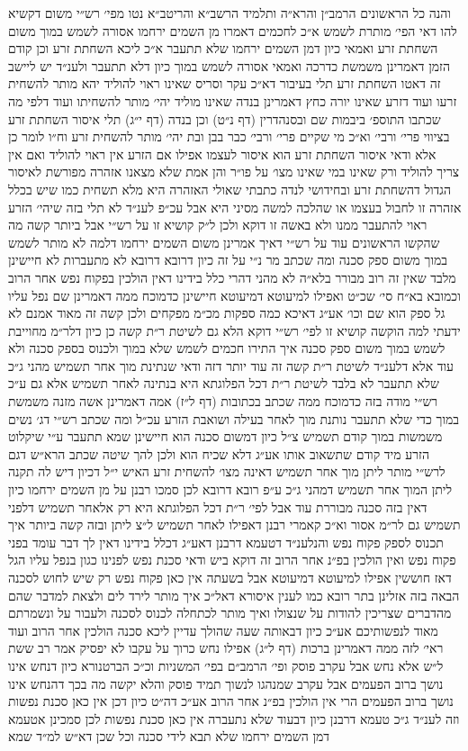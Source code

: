 \documentclass[12pt, openany]{book}
\begin{document}
\begin{multicols}{2}
והנה כל הראשונים הרמב״ן והרא״ה ותלמיד הרשב״א והריטב״א נטו מפי׳ רש״י משום דקשיא להו דאי הפי׳ מותרת לשמש א״כ לחכמים דאמרו מן השמים ירחמו אסורה לשמש במוך משום השחתת זרע ואמאי כיון דמן השמים ירחמו שלא תתעבר א״כ ליכא השחתת זרע וכן קודם הזמן דאמרינן משמשת כדרכה ואמאי אסורה לשמש במוך כיון דלא תתעבר ולענ״ד יש ליישב זה דאטו השחתת זרע תלי בעיבור דא״כ עקר וסריס שאינו ראוי להוליד יהא מותר להשחית זרעו ועוד דזרע שאינו יורה כחץ דאמרינן בנדה שאינו מוליד יהי׳ מותר להשחיתו ועוד דלפי מה שכתבו התוספ׳ ביבמות שם ובסנהדרין (דף נ״ט) וכן בנדה (דף י״ג) תלי איסור השחתת זרע בציווי פרי׳ ורבי׳ וא״כ מי שקיים פרי׳ ורבי׳ כבר בבן ובת יהי׳ מותר להשחית זרע וח״ו לומר כן אלא ודאי איסור השחתת זרע הוא איסור לעצמו אפילו אם הזרע אין ראוי להוליד ואם אין צריך להוליד ורק שאינו במי שאינו מצו׳ על פו״ר והן אמת שלא מצאנו אזהרה מפורשת לאיסור הגדול דהשחתת זרע ובחידושי לנדה כתבתי שאולי האזהרה היא מלא תשחית כמו שיש בכלל אזהרה זו לחבול בעצמו או שהלכה למשה מסיני היא אבל עכ״פ לענ״ד לא תלי בזה שיהי׳ הזרע ראוי להתעבר ממנו ולא באשה זו דוקא ולכן ל״ק קושיא זו על רש״י אבל ביותר קשה מה שהקשו הראשונים עוד על רש״י דאיך אמרינן משום השמים ירחמו דלמה לא מותר לשמש במוך משום ספק סכנה ומה שכתב מר נ״י על זה כיון דרובא דרובא לא מתעברות לא חיישינן מלבד שאין זה רוב מבורר בלא״ה לא מהני דהרי כלל בידינו דאין הולכין בפקוח נפש אחר הרוב וכמובא בא״ח סי׳ שכ״ט ואפילו למיעוטא דמיעוטא חיישינן כדמוכח ממה דאמרינן שם נפל עליו גל ספק הוא שם וכו׳ אע״ג דאיכא כמה ספקות מכ״מ מפקחים ולכן קשה זה מאוד אמנם לא ידעתי למה הוקשה קושיא זו לפי׳ רש״י דוקא הלא גם לשיטת ר״ת קשה כן כיון דלר״מ מחוייבת לשמש במוך משום ספק סכנה איך התירו חכמים לשמש שלא במוך ולכנוס בספק סכנה ולא עוד אלא דלענ״ד לשיטת ר״ת קשה זה עוד יותר דזה ודאי שנתינת מוך אחר תשמיש מהני ג״כ שלא תתעבר לא בלבד לשיטת ר״ת דכל הפלוגתא היא בנתינה לאחר תשמיש אלא גם ע״כ רש״י מודה בזה כדמוכח ממה שכתב בכתובות (דף ל״ז) אמה דאמרינן אשה מזנה משמשת במוך כדי שלא תתעבר נותנת מוך לאחר בעילה ושואבת הזרע עכ״ל ומה שכתב רש״י דג׳ נשים משמשות במוך קודם תשמיש צ״ל כיון דמשום סכנה הוא חיישינן שמא תתעבר ע״י שיקלוט הזרע מיד קודם שתשאוב אותו אע״ג דלא שכיח הוא ולכן להך שיטה שכתב הרא״ש דגם לרש״י מותר ליתן מוך אחר תשמיש דאינה מצו׳ להשחית זרע האיש י״ל דכיון דיש לה תקנה ליתן המוך אחר תשמיש דמהני ג״כ ע״פ רובא דרובא לכן סמכו רבנן על מן השמים ירחמו כיון דאין בזה סכנה מבוררת עוד אבל לפי׳ ר״ת דכל הפלוגתא היא רק אלאחר תשמיש דלפני תשמיש גם לר״מ אסור וא״כ קאמרי רבנן דאפילו לאחר תשמיש ל״צ ליתן ובזה קשה ביותר איך תכנוס לספק פקוח נפש והנלענ״ד דטעמא דרבנן דאע״ג דכלל בידינו דאין לך דבר עומד בפני פקוח נפש ואין הולכין בפ״נ אחר הרוב זה דוקא ביש ודאי סכנת נפש לפנינו כגון בנפל עליו הגל דאז חוששין אפילו למיעוטא דמיעוטא אבל בשעתה אין כאן פקוח נפש רק שיש לחוש לסכנה הבאה בזה אזלינן בתר רובא כמו לענין איסורא דאל״כ איך מותר לירד לים ולצאת למדבר שהם מהדברים שצריכין להודות על שנצולו ואיך מותר לכתחלה לכנוס לסכנה ולעבור על ונשמרתם מאוד לנפשותיכם אע״כ כיון דבאותה שעה שהולך עדיין ליכא סכנה הולכין אחר הרוב ועוד ראי׳ לזה ממה דאמרינן ברכות (דף ל״ג) אפילו נחש כרוך על עקבו לא יפסיק אמר רב ששת ל״ש אלא נחש אבל עקרב פוסק ופי׳ הרמב״ם בפי׳ המשניות וכ״כ הברטנורא כיון דנחש אינו נושך ברוב הפעמים אבל עקרב שמנהגו לנשוך תמיד פוסק והלא יקשה מה בכך דהנחש אינו נושך ברוב הפעמים הרי אין הולכין בפ״נ אחר הרוב אע״כ דה״ט כיון דכן אין כאן סכנת נפשות וזה לענ״ד ג״כ טעמא דרבנן כיון דבעוד שלא נתעברה אין כאן סכנת נפשות לכן סמכינן אטעמא דמן השמים ירחמו שלא תבא לידי סכנה וכל שכן דא״ש למ״ד שמא 
\end{multicols}
\end{document}
